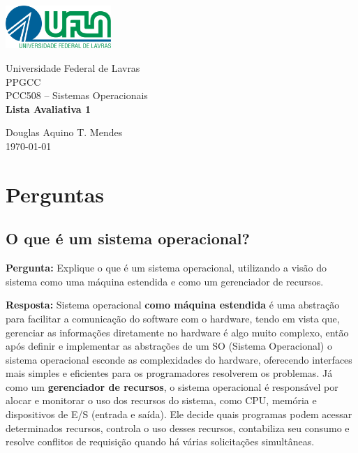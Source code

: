 \documentclass{article}
\begin{document}
\begin{titlepage}
    \centering
    \includegraphics[width=0.3\textwidth]{./Imagens/Logo UFLA - Colorida chapada.png}

    \vspace*{2cm} %
    \Large
    Universidade Federal de Lavras\\
    PPGCC\\
    PCC508 – Sistemas Operacionais\\
    
    \vspace{2cm} %
    \huge %
    \textbf{Lista Avaliativa 1}
    
    \vfill %
    
    \large
    Douglas Aquino T. Mendes\\
    \today %
\end{titlepage}

\tableofcontents
\newpage

\section{Perguntas}
\subsection{O que é um sistema operacional?}

\textbf{Pergunta:} Explique o que é um sistema operacional, utilizando a visão do sistema como uma máquina estendida e como um gerenciador de recursos.\newline

\textbf{Resposta:} Sistema operacional \textbf{como máquina estendida} é uma abstração para facilitar a comunicação do software com o hardware, tendo em vista que, gerenciar as informações diretamente no hardware é algo muito complexo, então após definir e implementar as abstrações de um SO (Sistema Operacional) o sistema operacional esconde as complexidades do hardware, oferecendo interfaces mais simples e eficientes para os programadores resolverem os problemas. Já como um \textbf{gerenciador de recursos}, o sistema operacional é responsável por alocar e monitorar o uso dos recursos do sistema, como CPU, memória e dispositivos de E/S (entrada e saída). Ele decide quais programas podem acessar determinados recursos, controla o uso desses recursos, contabiliza seu consumo e resolve conflitos de requisição quando há várias solicitações simultâneas.
\cite{ufsm2018}
\end{document}
